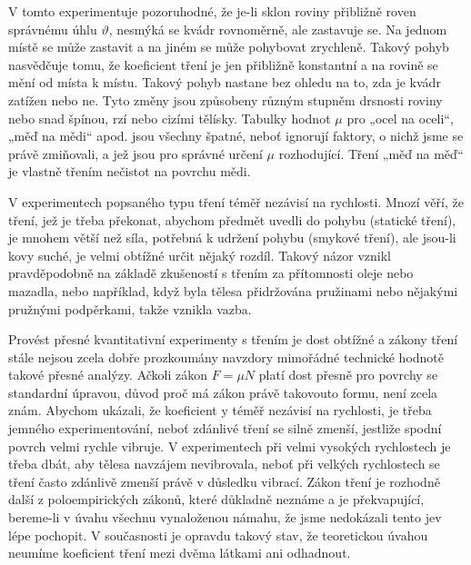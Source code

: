 {    V tomto experimentuje pozoruhodné, že je-li sklon roviny přibližně roven správnému úhlu 
    \(\vartheta\), nesmýká se kvádr rovnoměrně, ale zastavuje se. Na jednom místě se může zastavit 
    a na jiném se může pohybovat zrychleně. Takový pohyb nasvědčuje tomu, že koeficient tření je 
    jen přibližně konstantní a na rovině se mění od místa k místu. Takový pohyb nastane bez ohledu 
    na to, zda je kvádr zatížen nebo ne. Tyto změny jsou způsobeny různým stupněm drsnosti roviny 
    nebo snad špínou, rzí nebo cizími tělísky. Tabulky hodnot \(\mu\) pro „ocel na oceli“, „měď na 
    mědi“ apod. jsou všechny špatné, neboť ignorují faktory, o nichž jsme se právě zmiňovali, a jež 
    jsou pro správné určení \(\mu\) rozhodující. Tření „měď na měď“ je vlastně třením nečistot na 
    povrchu mědi.
    
    V experimentech popsaného typu tření téměř nezávisí na rychlosti. Mnozí věří, že tření, jež je 
    třeba překonat, abychom předmět uvedli do pohybu (statické tření), je mnohem větší než síla, 
    potřebná k udržení pohybu (smykové tření), ale jsou-li kovy suché, je velmi obtížné určit 
    nějaký rozdíl. Takový názor vznikl pravděpodobně na základě zkušeností s třením za přítomnosti 
    oleje nebo mazadla, nebo například, když byla tělesa přidržována pružinami nebo nějakými 
    pružnými podpěrkami, takže vznikla vazba.
    
    Provést přesné kvantitativní experimenty s třením je dost obtížné a zákony tření stále nejsou 
    zcela dobře prozkoumány navzdory mimořádné technické hodnotě takové přesné analýzy. Ačkoli 
    zákon \(F= \mu N\) platí dost přesně pro povrchy se standardní úpravou, důvod proč má zákon 
    právě takovouto formu, není zcela znám. Abychom ukázali, že koeficient y téměř nezávisí na 
    rychlosti, je třeba jemného experimentování, neboť zdánlivé tření se silně zmenší, jestliže 
    spodní povrch velmi rychle vibruje. V experimentech při velmi vysokých rychlostech je třeba 
    dbát, aby tělesa navzájem nevibrovala, neboť při velkých rychlostech se tření často zdánlivě 
    zmenší právě v důsledku vibrací. Zákon tření je rozhodně další z poloempirických zákonů, které 
    důkladně neznáme a je překvapující, bereme-li v úvahu všechnu vynaloženou námahu, že jsme 
    nedokázali tento jev lépe pochopit. V současnosti je opravdu takový stav, že teoretickou úvahou 
    neumíme koeficient tření mezi dvěma látkami ani odhadnout.
    
}
